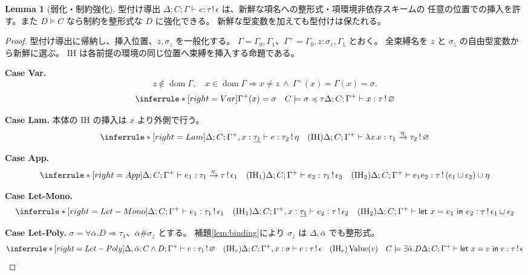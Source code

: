 \documentclass[a4paper,11pt]{article}
\theoremstyle{definition}
\newtheorem{lemma}[definition]{Lemma}
\newenvironment{Case}[1]{\par\smallskip\noindent\textbf{Case #1.}\enspace\ignorespaces}{\par}
\newcommand{\dom}{\operatorname{dom}}
\newcommand{\emp}{\varnothing}
\newcommand{\arr}[3]{#1\xrightarrow{#2}#3}
\newcommand{\jj}[6]{#1;#2;#3\vdash #4:#5\,!\,#6}
\newcommand{\J}[3]{\jj{\Delta}{C}{\Gamma}{#1}{#2}{#3}}
\newcommand{\inst}[2]{#1\preccurlyeq #2}
\newcommand{\lete}[3]{\mathsf{let}\ #1=#2\ \mathsf{in}\ #3}
\newcommand{\mono}[1]{\underline{#1}}
\newcommand{\Val}{\operatorname{Value}}
\newcommand{\proofspace}{\Needspace{16\baselineskip}}
\begin{document}
\proofspace
\begin{samepage}
\begin{lemma}[弱化・制約強化]\label{lem:weakening}
型付け導出 $\J e\tau\epsilon$ は、新鮮な項名への整形式・項環境非依存スキームの
任意の位置での挿入を許す。また $D\models C$ なら制約を整形式な $D$ に強化できる。
新鮮な型変数を加えても型付けは保たれる。
\end{lemma}
\end{samepage}
\nopagebreak[4]
\begin{proof}\leavevmode\label{proof:lem:weakening}
型付け導出に帰納し、挿入位置、$z,\sigma_z$ を一般化する。
$\Gamma=\Gamma_0,\Gamma_1$、$\Gamma^+=\Gamma_0,z:\sigma_z,\Gamma_1$ とおく。
全束縛名を $z$ と $\sigma_z$ の自由型変数から新鮮に選ぶ。
IH は各前提の環境の同じ位置へ束縛を挿入する命題である。

\begin{Case}{Var}
\[z\notin\dom\Gamma,\quad x\in\dom\Gamma
 \Longrightarrow x\ne z\ \land\ \Gamma^+(x)=\Gamma(x)=\sigma.\]
\[
\inferrule*[right=Var]{\Gamma^+(x)=\sigma\quad C\models\inst\sigma\tau}{\jj{\Delta}{C}{\Gamma^+}{x}{\tau}{\emp}}
\]
\end{Case}

\begin{Case}{Lam}
本体の IH の挿入は $x$ より外側で行う。
\[
\inferrule*[right=Lam]{\jj{\Delta}{C}{\Gamma^+,x:\mono{\tau_1}}{e}{\tau_2}{\eta}\quad(\mathrm{IH})}{\jj{\Delta}{C}{\Gamma^+}{\lambda x.e}{\arr{\tau_1}\eta{\tau_2}}{\emp}}
\]
\end{Case}

\begin{Case}{App}
\[
\inferrule*[right=App]{\jj{\Delta}{C}{\Gamma^+}{e_1}{\arr{\tau_1}\eta\tau}{\epsilon_1}\quad(\mathrm{IH}_1)\\\jj{\Delta}{C}{\Gamma^+}{e_2}{\tau_1}{\epsilon_2}\quad(\mathrm{IH}_2)}{\jj{\Delta}{C}{\Gamma^+}{e_1e_2}{\tau}{(\epsilon_1\cup\epsilon_2)\cup\eta}}
\]
\end{Case}

\begin{Case}{Let-Mono}
\[
\inferrule*[right=Let-Mono]{\jj{\Delta}{C}{\Gamma^+}{e_1}{\tau_1}{\epsilon_1}\quad(\mathrm{IH}_1)\\\jj{\Delta}{C}{\Gamma^+,x:\mono{\tau_1}}{e_2}{\tau}{\epsilon_2}\quad(\mathrm{IH}_2)}{\jj{\Delta}{C}{\Gamma^+}{\lete x{e_1}{e_2}}{\tau}{\epsilon_1\cup\epsilon_2}}
\]
\end{Case}

\begin{Case}{Let-Poly}
$\sigma=\forall\bar\alpha.D\Rightarrow\tau_1$、$\bar\alpha\#\sigma_z$ とする。
補題\ref{lem:binding}により $\sigma_z$ は $\Delta,\bar\alpha$ でも整形式。
\[
\inferrule*[right=Let-Poly]{\jj{\Delta,\bar\alpha}{C\land D}{\Gamma^+}{v}{\tau_1}{\emp}\quad(\mathrm{IH}_v)\\\jj{\Delta}{C}{\Gamma^+,x:\sigma}{e}{\tau}{\epsilon}\quad(\mathrm{IH}_e)\\\Val(v)\quad C\models\exists\bar\alpha.D}{\jj{\Delta}{C}{\Gamma^+}{\lete x v e}{\tau}{\epsilon}}
\]
\end{Case}


\end{proof}
\end{document}

